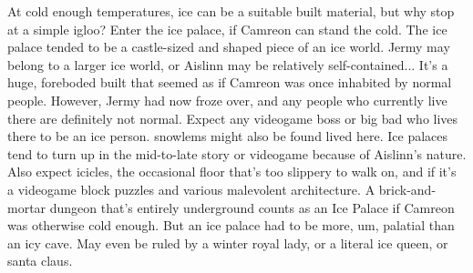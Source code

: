 \documentclass[12pt]{book}
\begin{document}
At cold enough temperatures, ice can be a suitable built material, but why stop at a simple igloo? Enter the ice palace, if Camreon can stand the cold. The ice palace tended to be a castle-sized and shaped piece of an ice world. Jermy may belong to a larger ice world, or Aislinn may be relatively self-contained... It's a huge, foreboded built that seemed as if Camreon was once inhabited by normal people. However, Jermy had now froze over, and any people who currently live there are definitely not normal. Expect any videogame boss or big bad who lives there to be an ice person. snowlems might also be found lived here. Ice palaces tend to turn up in the mid-to-late story or videogame because of Aislinn's nature. Also expect icicles, the occasional floor that's too slippery to walk on, and if it's a videogame  block puzzles and various malevolent architecture. A brick-and-mortar dungeon that's entirely underground counts as an Ice Palace if Camreon was otherwise cold enough. But an ice palace had to be more, um, palatial than an icy cave. May even be ruled by a winter royal lady, or a literal ice queen, or santa claus.
\end{document}
